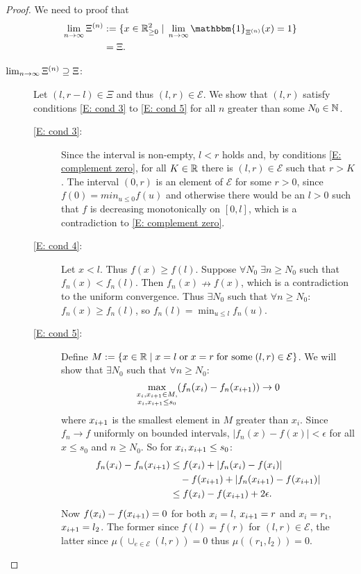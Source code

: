 \begin{proof}
We need to proof that
\begin{equation}
\begin{aligned}
\lim_{n \rightarrow \infty} \Xin 
&:= \lbrace x \in \Real_{\geq 0}^2 \; | \; \lim_{n \rightarrow \infty} \mathbbm{1}_{\Xin}(x) = 1 \rbrace \\ 
&= \Xi.
\end{aligned}
\end{equation}
\begin{description} %
\item[$\lim_{n \rightarrow \infty} \Xi^{(n)} \supseteq \Xi$:] 
Let $(l, r-l) \in \Xi$ and thus $(l, r) \in \mathcal{E}$.
We show that $(l,r)$ satisfy conditions \eqref{E: cond 3} to \eqref{E: cond 5} for all $n$ greater than some $N_0 \in \mathbb{N}$.

\begin{description} %
	\item[\eqref{E: cond 3}:] 
Since the interval is non-empty, $l < r$ holds
and, by conditions \eqref{E: complement zero},
for all $K \in \mathbb{R}$ there is $(l,r) \in \mathcal{E}$ such that $r > K$.
The interval $(0,r)$ is an element of $\mathcal{E}$ for some $r>0$, 
since $f(0) = min_{u \leq 0}f(u)$
and otherwise there would be an $l>0$ such that $f$ is decreasing monotonically on $[0,l]$,
which is a contradiction to \eqref{E: complement zero}.
	\item[\eqref{E: cond 4}:]
Let $x < l$. Thus $f(x) \geq f(l)$. 
Suppose $\forall N_0 \; \exists n \geq N_0$ such that
$f_n(x) < f_n(l)$.
Then $f_n(x) \nrightarrow f(x)$, 
which is a contradiction to the uniform convergence.
Thus $\exists N_0$ such that $\forall n \geq N_0$: 
$f_n(x) \geq f_n(l)$, so
$f_n(l) = \min_{u \leq l}f_n(u)$.
	\item[\eqref{E: cond 5}:]
Define $M:=\lbrace x \in \mathbb{R} \; | \; x=l \; \text{or} \; x=r \; \text{for some} \; (l,r) \in \mathcal{E} \rbrace$.
We will show that $\exists N_0$ such that $\forall n \geq N_0$:
\begin{equation*}
\max_{\substack{x_i, x_{i+1} \in M, \\ x_i, x_{i+1} \leq s_0}} (f_n(x_i) - f_n(x_{i+1})) \rightarrow 0
\end{equation*}
where $x_{i+1}$ is the smallest element in $M$ greater than $x_i$.
Since $f_n \rightarrow f$ uniformly on bounded intervals, 
$|f_n(x) - f(x)| < \epsilon$ for all $x \leq s_0$ and $n \geq N_0$.
So for $x_i, x_{i+1} \leq s_0$:
\begin{equation}
\begin{aligned}
f_n(x_i) - f_n(x_{i+1}) 
&\leq f(x_i) + |f_n(x_i) - f(x_i)| \\
&\quad - f(x_{i+1}) + |f_n(x_{i+1}) -f(x_{i+1})| \\
&\leq f(x_i) - f(x_{i+1}) + 2\epsilon.
\end{aligned} 
\end{equation}
Now $f(x_i) - f(x_{i+1}) = 0$ for both $x_i = l$, $x_{i+1} = r$ 
and $x_i = r_1$, $x_{i+1} = l_2$. 
The former since $f(l) = f(r)$ for $(l,r) \in \mathcal{E}$,
the latter since $\mu \left(\cup_{e \in \mathcal{E}} (l,r)\right) = 0$
thus $\mu \left( (r_1, l_2) \right) = 0$.


\end{description}
\end{description}
\end{proof}
